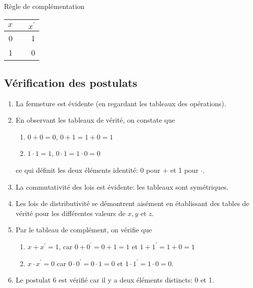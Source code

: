 \documentclass[11pt]{article}
\begin{document}
Règle de complémentation

\begin{center}
\begin{tabular}{rlr}
\(x\) &  & \(x^{\prime}\)\\
\hline
0 &  & 1\\
1 &  & 0\\
\end{tabular}
\end{center}


\subsection{Vérification des postulats}
\label{sec:org45cd07c}

\begin{enumerate}
\item La fermeture est évidente (en regardant les tableaux des opérations).

\item En observant les tableaux de vérité, on constate que

\begin{enumerate}
\item \(0 + 0 = 0\), \(0 + 1 = 1 + 0 = 1\)

\item \(1 \cdot 1 = 1\), \(0 \cdot 1 = 1 \cdot 0 = 0\)
\end{enumerate}

ce qui définit les deux éléments identité: 0 pour \(+\) et 1 pour  \(\cdot\).

\item La commutativité des lois est évidente: les tableaux sont
symétriques.

\item Les lois de distributivité se démontrent aisément en établissant des
tables de vérité pour les différentes valeurs de \(x, y\) et \(z\).

\item Par le tableau de complément, on vérifie que

\begin{enumerate}
\item \(x + x^{\prime} = 1\), car \(0 + 0^{\prime} = 0 + 1 = 1\) et \(1 +
        1^{\prime} = 1+ 0 = 1\)

\item \(x \cdot x^{\prime} = 0\) car \(0 \cdot 0^{\prime} = 0 \cdot 1 =
        0\) et \(1 \cdot 1^{\prime} = 1 \cdot 0 = 0\).
\end{enumerate}

\item Le postulat 6 est vérifié car il y a deux éléments distincts: 0 et 1.
\end{enumerate}
\end{document}
